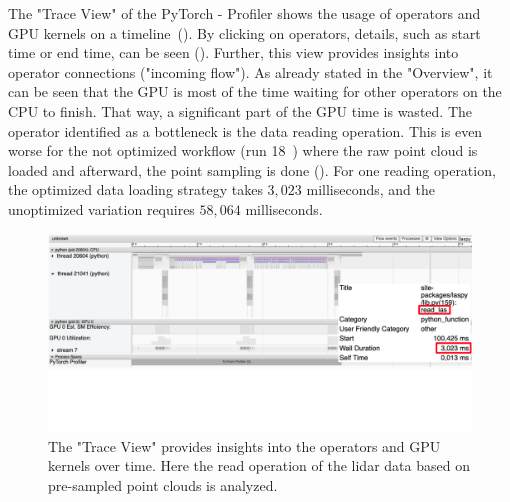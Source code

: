 \documentclass[12pt, a4paper, hidelinks]{article}
\begin{document}
The "Trace View" of the PyTorch - Profiler shows the usage of operators and GPU kernels on a timeline~(). By clicking on operators, details, such as start time or end time, can be seen (). Further, this view provides insights into operator connections ("incoming flow").
As already stated in the "Overview", it can be seen that the GPU is most of the time waiting for other operators on the CPU to finish. That way, a significant part of the GPU time is wasted. The operator identified as a bottleneck is the data reading operation. This is even worse for the not optimized workflow (run 18~) where the raw point cloud is loaded and afterward, the point sampling is done (). For one reading operation, the optimized data loading strategy takes $3,023$ milliseconds, and the unoptimized variation requires $58,064$ milliseconds.

\begin{figure}[H]
\centering
\includegraphics[width=1\textwidth]{./assets/scap_gtx1080_profiler-torch_batch-size-64_14650758_trace-view-laspy}
\vspace{-6em}
\caption[PyTorch - Profiler: Trace View of data input]{The "Trace View" provides insights into the operators and GPU kernels over time. Here the read operation of the \ac{lidar} data based on pre-sampled point clouds is analyzed.}
\label{fig:scap_gtx1080_profiler-torch_batch-size-64_14650758_trace-view-laspy}
\end{figure}
\end{document}
